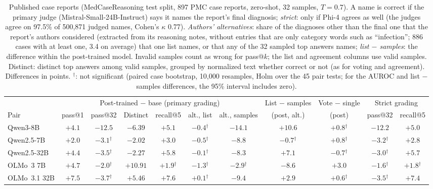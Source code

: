\documentclass[wcp]{jmlr}
\begin{document}
\begin{table}[t]
\medskip
\begin{adjustbox}{max width=\linewidth}
\begin{tabular}{lcccccccccc}
\toprule
 & \multicolumn{6}{c}{Post-trained $-$ base (primary grading)} & List $-$ samples & Vote $-$ single & \multicolumn{2}{c}{Strict grading} \\
Pair & pass@1 & pass@32 & Distinct & recall@5 & alt., list & alt., samples & (post, alt.) & (post) & pass@32 & recall@5 \\
\midrule
Qwen3-8B & $+4.1$ & $-12.5$ & $-6.39$ & $+5.1$ & $-0.4$$^{\dagger}$ & $-14.1$ & $+10.6$ & $+0.8$$^{\dagger}$ & $-12.2$ & $+5.0$ \\
Qwen2.5-7B & $+2.0$ & $-3.1$$^{\dagger}$ & $-2.02$ & $+3.0$ & $-0.5$$^{\dagger}$ & $-8.8$ & $-0.7$$^{\dagger}$ & $+0.8$$^{\dagger}$ & $-3.2$$^{\dagger}$ & $+2.8$ \\
Qwen2.5-32B & $+4.4$ & $-3.5$$^{\dagger}$ & $-2.27$ & $+5.8$ & $-0.1$$^{\dagger}$ & $-8.3$ & $+7.1$ & $-0.7$$^{\dagger}$ & $-3.0$$^{\dagger}$ & $+5.7$ \\
OLMo~3 7B & $+4.7$ & $-2.0$$^{\dagger}$ & $+10.91$ & $+1.9$$^{\dagger}$ & $-1.3$$^{\dagger}$ & $-2.9$$^{\dagger}$ & $-8.6$ & $+3.0$ & $-1.6$$^{\dagger}$ & $+1.8$$^{\dagger}$ \\
OLMo~3.1 32B & $+7.5$ & $-3.7$$^{\dagger}$ & $+5.46$ & $+7.6$ & $+0.1$$^{\dagger}$ & $-9.4$ & $+2.9$ & $+0.6$$^{\dagger}$ & $-3.5$$^{\dagger}$ & $+7.4$ \\
\bottomrule
\end{tabular}
\end{adjustbox}
\caption{Published case reports (MedCaseReasoning test split, 897 PMC case reports, zero-shot, 32 samples, $T{=}0.7$). A name is correct if the primary judge (Mistral-Small-24B-Instruct) says it names the report's final diagnosis; \emph{strict}: only if Phi-4 agrees as well (the judges agree on 97.5\% of 500,871 judged names, Cohen's $\kappa$ 0.77). \emph{Authors' alternatives}: share of the diagnoses other than the final one that the report's authors considered (extracted from its reasoning notes, without entries that are only category words such as ``infection''; 886 cases with at least one, 3.4 on average) that one list names, or that any of the 32 sampled top answers names; \emph{list $-$ samples}: the difference within the post-trained model. Invalid samples count as wrong for pass@$k$; the list and agreement columns use valid samples. Distinct: distinct top answers among valid samples, grouped by normalized text whether correct or not (as for voting and agreement). Differences in points. $^{\dagger}$: not significant (paired case bootstrap, 10,000 resamples, Holm over the 45 pair tests; for the AUROC and list $-$ samples differences, the 95\% interval includes zero).}
\label{tab:medcase}
\end{table}
\end{document}
